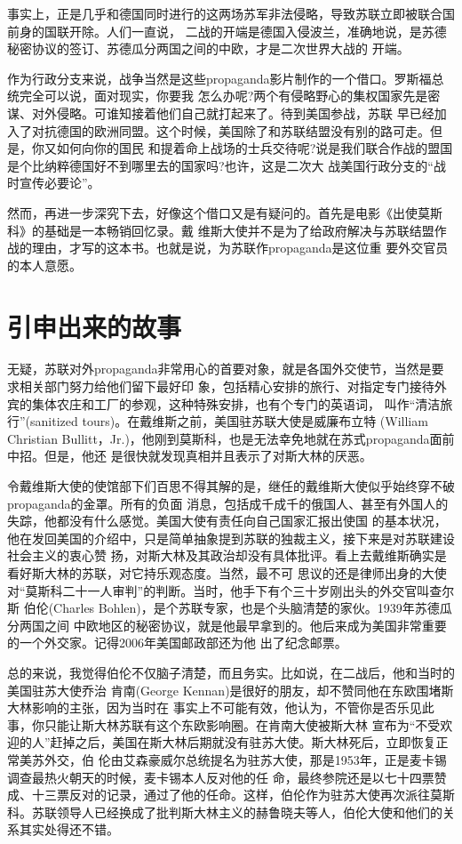 \documentclass[10pt]{article}
\begin{document}
{事实上，正是几乎和德国同时进行的这两场苏军非法侵略，导致苏联立即被联合国前身的国联开除。人们一直说，
二战的开端是德国入侵波兰，准确地说，是苏德秘密协议的签订、苏德瓜分两国之间的中欧，才是二次世界大战的
开端。

作为行政分支来说，战争当然是这些propaganda影片制作的一个借口。罗斯福总统完全可以说，面对现实，你要我
怎么办呢?两个有侵略野心的集权国家先是密谋、对外侵略。可谁知接着他们自己就打起来了。待到美国参战，苏联
早已经加入了对抗德国的欧洲同盟。这个时候，美国除了和苏联结盟没有别的路可走。但是，你又如何向你的国民
和提着命上战场的士兵交待呢?说是我们联合作战的盟国是个比纳粹德国好不到哪里去的国家吗?也许，这是二次大
战美国行政分支的``战时宣传必要论''。

然而，再进一步深究下去，好像这个借口又是有疑问的。首先是电影《出使莫斯科》的基础是一本畅销回忆录。戴
维斯大使并不是为了给政府解决与苏联结盟作战的理由，才写的这本书。也就是说，为苏联作propaganda是这位重
要外交官员的本人意愿。

\pagebreak
\section{引申出来的故事}

无疑，苏联对外propaganda非常用心的首要对象，就是各国外交使节，当然是要求相关部门努力给他们留下最好印
象，包括精心安排的旅行、对指定专门接待外宾的集体农庄和工厂的参观，这种特殊安排，也有个专门的英语词，
叫作``清洁旅行''(sanitized tours)。在戴维斯之前，美国驻苏联大使是威廉\textperiodcentered 布立特
(William Christian Bullitt，Jr.)，他刚到莫斯科，也是无法幸免地就在苏式propaganda面前中招。但是，他还
是很快就发现真相并且表示了对斯大林的厌恶。

令戴维斯大使的使馆部下们百思不得其解的是，继任的戴维斯大使似乎始终穿不破propaganda的金罩。所有的负面
消息，包括成千成千的俄国人、甚至有外国人的失踪，他都没有什么感觉。美国大使有责任向自己国家汇报出使国
的基本状况，他在发回美国的介绍中，只是简单抽象提到苏联的独裁主义，接下来是对苏联建设社会主义的衷心赞
扬，对斯大林及其政治却没有具体批评。看上去戴维斯确实是看好斯大林的苏联，对它持乐观态度。当然，最不可
思议的还是律师出身的大使对``莫斯科二十一人审判''的判断。当时，他手下有个三十岁刚出头的外交官叫查尔斯
\textperiodcentered 伯伦(Charles Bohlen)，是个苏联专家，也是个头脑清楚的家伙。1939年苏德瓜分两国之间
中欧地区的秘密协议，就是他最早拿到的。他后来成为美国非常重要的一个外交家。记得2006年美国邮政部还为他
出了纪念邮票。

总的来说，我觉得伯伦不仅脑子清楚，而且务实。比如说，在二战后，他和当时的美国驻苏大使乔治
\textperiodcentered 肯南(George Kennan)是很好的朋友，却不赞同他在东欧围堵斯大林影响的主张，因为当时在
事实上不可能有效，他认为，不管你是否乐见此事，你只能让斯大林苏联有这个东欧影响圈。在肯南大使被斯大林
宣布为``不受欢迎的人''赶掉之后，美国在斯大林后期就没有驻苏大使。斯大林死后，立即恢复正常美苏外交，伯
伦由艾森豪威尔总统提名为驻苏大使，那是1953年，正是麦卡锡调查最热火朝天的时候，麦卡锡本人反对他的任
命，最终参院还是以七十四票赞成、十三票反对的记录，通过了他的任命。这样，伯伦作为驻苏大使再次派往莫斯
科。苏联领导人已经换成了批判斯大林主义的赫鲁晓夫等人，伯伦大使和他们的关系其实处得还不错。

}
\end{document}
